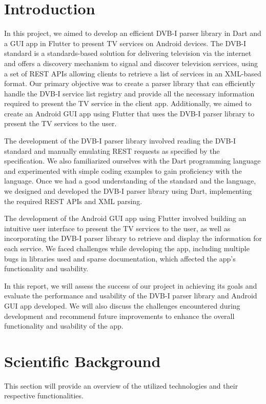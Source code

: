 \documentclass[conference]{IEEEtran}
\begin{document}
\section{Introduction}
In this project, we aimed to develop an efficient DVB-I parser library in Dart and a GUI app in Flutter to present TV services on Android devices. The DVB-I standard is a standards-based solution for delivering television via the internet and offers a discovery mechanism to signal and discover television services, using a set of REST APIs allowing clients to retrieve a list of services in an XML-based format. Our primary objective was to create a parser library that can efficiently handle the DVB-I service list registry and provide all the necessary information required to present the TV service in the client app. Additionally, we aimed to create an Android GUI app using Flutter that uses the DVB-I parser library to present the TV services to the user. 

The development of the DVB-I parser library involved reading the DVB-I standard and manually emulating REST requests as specified by the specification. We also familiarized ourselves with the Dart programming language and experimented with simple coding examples to gain proficiency with the language. Once we had a good understanding of the standard and the language, we designed and developed the DVB-I parser library using Dart, implementing the required REST APIs and XML parsing. 

The development of the Android GUI app using Flutter involved building an intuitive user interface to present the TV services to the user, as well as incorporating the DVB-I parser library to retrieve and display the information for each service. We faced challenges while developing the app, including multiple bugs in libraries used and sparse documentation, which affected the app's functionality and usability.

In this report, we will assess the success of our project in achieving its goals and evaluate the performance and usability of the DVB-I parser library and Android GUI app developed. We will also discuss the challenges encountered during development and recommend future improvements to enhance the overall functionality and usability of the app.

\section{Scientific Background}

This section will provide an overview of the utilized technologies and their respective functionalities.
\end{document}
